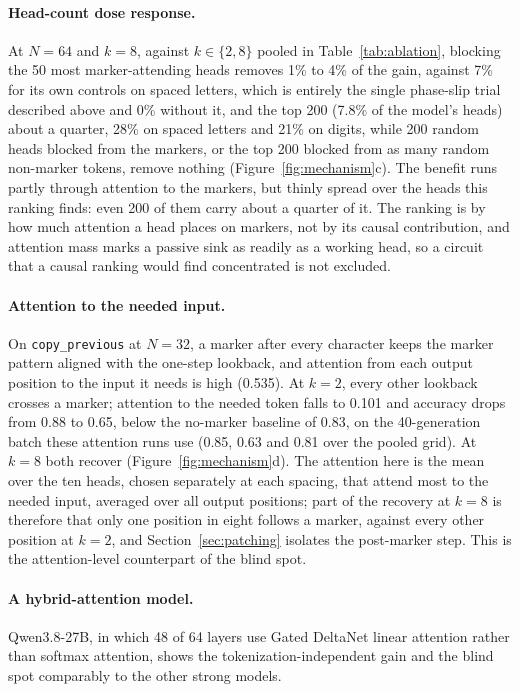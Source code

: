 \documentclass[10pt]{article} %
\newcommand{\task}[1]{\texttt{#1}}
\begin{document}
\paragraph{Head-count dose response.} At $N = 64$ and $k = 8$, against $k \in \{2, 8\}$ pooled in Table~\ref{tab:ablation}, blocking the 50 most marker-attending heads removes 1\% to 4\% of the gain, against 7\% for its own controls on spaced letters, which is entirely the single phase-slip trial described above and 0\% without it, and the top 200 (7.8\% of the model's heads) about a quarter, 28\% on spaced letters and 21\% on digits, while 200 random heads blocked from the markers, or the top 200 blocked from as many random non-marker tokens, remove nothing (Figure~\ref{fig:mechanism}c). The benefit runs partly through attention to the markers, but thinly spread over the heads this ranking finds: even 200 of them carry about a quarter of it. The ranking is by how much attention a head places on markers, not by its causal contribution, and attention mass marks a passive sink as readily as a working head, so a circuit that a causal ranking would find concentrated is not excluded.

\paragraph{Attention to the needed input.} On \task{copy\_previous} at $N=32$, a marker after every character keeps the marker pattern aligned with the one-step lookback, and attention from each output position to the input it needs is high (0.535). At $k=2$, every other lookback crosses a marker; attention to the needed token falls to 0.101 and accuracy drops from 0.88 to 0.65, below the no-marker baseline of 0.83, on the 40-generation batch these attention runs use (0.85, 0.63 and 0.81 over the pooled grid). At $k=8$ both recover (Figure~\ref{fig:mechanism}d). The attention here is the mean over the ten heads, chosen separately at each spacing, that attend most to the needed input, averaged over all output positions; part of the recovery at $k = 8$ is therefore that only one position in eight follows a marker, against every other position at $k = 2$, and Section~\ref{sec:patching} isolates the post-marker step. This is the attention-level counterpart of the blind spot.

\paragraph{A hybrid-attention model.} Qwen3.8-27B, in which 48 of 64 layers use Gated DeltaNet linear attention \citep{yang2025gated} rather than softmax attention, shows the tokenization-independent gain and the blind spot comparably to the other strong models.
\end{document}
